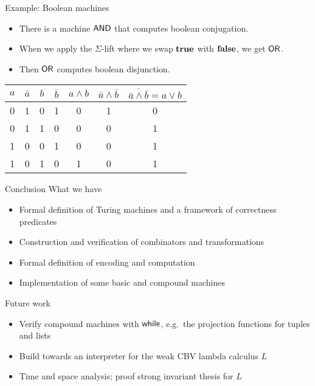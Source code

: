 \begin{frame}{Example: Boolean machines}
  \begin{itemize}
    \item There is a machine $\textsf{AND}$ that computes boolean conjugation.
    \item When we apply the $\Sigma$-lift where we swap $\mathbf{true}$ with $\mathbf{false}$, we get $\textsf{OR}$.
    \item Then $\textsf{OR}$ computes boolean disjunction.
  \end{itemize}
	\begin{table}
		\begin{tabular}{|cc|cc|c|c|c|}
			\hline
			$a$ & $\bar{a}$ & $b$ & $\bar{b}$ & $a\land b$ & $\bar{a}\land\bar{b}$ & $\overline{\bar{a}\land\bar{b}}=a\lor b$\tabularnewline
			\hline
			\hline
			0 & 1 & 0 & 1 & 0 & 1 & 0\tabularnewline
			\hline
			0 & 1 & 1 & 0 & 0 & 0 & 1\tabularnewline
			\hline
			1 & 0 & 0 & 1 & 0 & 0 & 1\tabularnewline
			\hline
			1 & 0 & 1 & 0 & 1 & 0 & 1\tabularnewline
			\hline
		\end{tabular}
	\end{table}
\end{frame}


\begin{frame}{Conclusion}
  What we have
  \begin{itemize}
    \item Formal definition of Turing machines and a framework of correctness predicates
    \item Construction and verification of combinators and transformations
    \item Formal definition of encoding and computation
    \item Implementation of some basic and compound machines
  \end{itemize}

  Future work
  \begin{itemize}
    \item Verify compound machines with $\textsf{while}$, e.g.\ the projection functions for tuples and lists
    \item Build towards an interpreter for the weak CBV lambda calculus $L$
    \item Time and space analysis; proof strong invariant thesis for $L$
  \end{itemize}
\end{frame}

\appendix %

